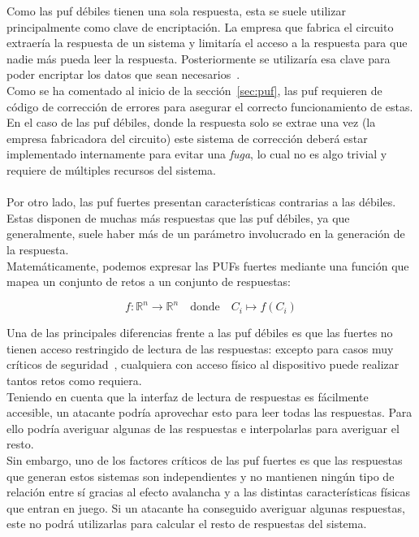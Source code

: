 \documentclass[spanish]{template/minim}
\begin{document}
Como las \gls{puf} débiles tienen una sola respuesta, esta se suele utilizar principalmente como clave de encriptación. La empresa que fabrica el circuito extraería la respuesta de un sistema y limitaría el acceso a la respuesta para que nadie más pueda leer la respuesta. Posteriormente se utilizaría esa clave para poder encriptar los datos que sean necesarios~\cite{puf_glance}.\\

Como se ha comentado al inicio de la sección~\ref{sec:puf}, las \gls{puf} requieren de código de corrección de errores para asegurar el correcto funcionamiento de estas. En el caso de las \gls{puf} débiles, donde la respuesta solo se extrae una vez (la empresa fabricadora del circuito) este sistema de corrección deberá estar implementado internamente para evitar una \textit{fuga}, lo cual no es algo trivial y requiere de múltiples recursos del sistema.\\\\

Por otro lado, las \gls{puf} fuertes presentan características contrarias a las débiles. Estas disponen de muchas más respuestas que las \gls{puf} débiles, ya que generalmente, suele haber más de un parámetro involucrado en la generación de la respuesta.\\

Matemáticamente, podemos expresar las PUFs fuertes mediante una función que mapea un conjunto de retos a un conjunto de respuestas:

\begin{equation}
    f : \mathbb{R}^n \rightarrow \mathbb{R}^n \quad \text{donde} \quad C_i \mapsto f(C_i)
    \label{eq:strong_puf}
\end{equation}


Una de las principales diferencias frente a las \gls{puf} débiles es que las fuertes no tienen acceso restringido de lectura de las respuestas: excepto para casos muy críticos de seguridad~, cualquiera con acceso físico al dispositivo puede realizar tantos retos como requiera.\\

Teniendo en cuenta que la interfaz de lectura de respuestas es fácilmente accesible, un atacante podría aprovechar esto para leer todas las respuestas. Para ello podría averiguar algunas de las respuestas e interpolarlas para averiguar el resto.\\
Sin embargo, uno de los factores críticos de las \gls{puf} fuertes es que las respuestas que generan estos sistemas son independientes y no mantienen ningún tipo de relación entre sí gracias al efecto avalancha y a las distintas características físicas que entran en juego. Si un atacante ha conseguido averiguar algunas respuestas, este no podrá utilizarlas para calcular el resto de respuestas del sistema.\\
\end{document}
